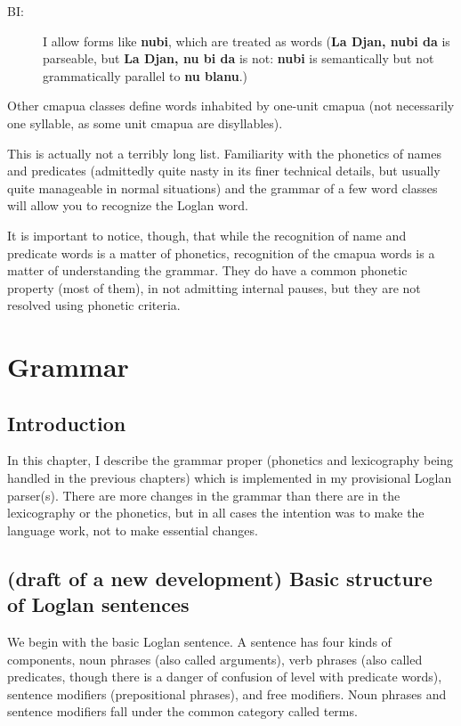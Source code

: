 \documentclass[12pt]{book}
\begin{document}
{\begin{description}
\item[BI:]  I allow forms like {\bf nubi}, which are treated as words ({\bf La Djan, nubi da} is parseable, but {\bf La Djan, nu bi da} is not:  {\bf nubi} is semantically but not grammatically parallel to {\bf nu blanu}.)

\end{description}

Other cmapua classes define words inhabited by one-unit cmapua (not necessarily one syllable, as some unit cmapua are disyllables).

This is actually not a terribly long list.  Familiarity with the phonetics of names and predicates (admittedly quite nasty in its finer technical details, but usually quite manageable in normal situations) and the grammar of a few word classes will allow you to recognize the Loglan word.   

It is important to notice, though, that while the recognition of name and predicate words is a matter of phonetics, recognition of the cmapua words is a matter of understanding the grammar.  They do have a common phonetic property (most of them), in not admitting internal pauses, but they are not resolved using phonetic criteria.

\chapter{Grammar}

\section{Introduction}

In this chapter, I describe the grammar proper (phonetics and lexicography being handled in the previous chapters) which is implemented in my provisional Loglan parser(s).  There are more changes in the grammar than there are in the lexicography or the phonetics, but in all cases the intention was to make the language work, not to make essential changes.

\section{(draft of a new development) Basic structure of Loglan sentences}

We begin with the basic Loglan sentence.  A sentence has four kinds of components, noun phrases (also called arguments), verb phrases (also called predicates, though there is a danger of confusion of level with predicate words), sentence modifiers (prepositional phrases), and free modifiers.  Noun phrases and sentence modifiers fall under the common category called terms.

}
\end{document}
